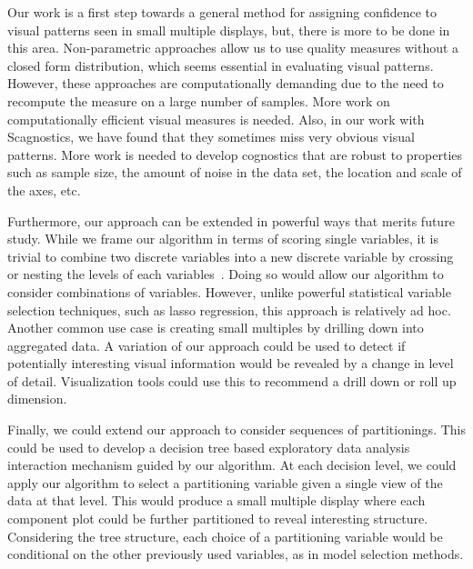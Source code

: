 Our work is a first step towards a general method for assigning confidence to visual patterns seen in small multiple displays, but, there is more to be done in this area. Non-parametric approaches allow us to use quality measures without a closed form distribution, which seems essential in evaluating visual patterns. However, these approaches are computationally demanding due to the need to recompute the measure on a large number of samples. More work on computationally efficient visual measures is needed. Also, in our work with Scagnostics, we have found that they sometimes miss very obvious visual patterns. More work is needed to develop cognostics that are robust to properties such as sample size, the amount of noise in the data set, the location and scale of the axes, etc. 

Furthermore, our approach can be extended in powerful ways that merits future study. While we frame our algorithm in terms of scoring single variables, it is trivial to combine two discrete variables into a new discrete variable by crossing or nesting the levels of each variables~\cite{Wilkinson2005GG,Stolte2002}. Doing so would allow our algorithm to consider combinations of variables. However, unlike powerful statistical variable selection techniques, such as lasso regression, this approach is relatively ad hoc.
Another common use case is creating small multiples by drilling down into aggregated data. A variation of our approach could be used to detect if potentially interesting visual information would be revealed by a change in level of detail. Visualization tools could use this to recommend a drill down or roll up dimension.

Finally, we could extend our approach to consider sequences of partitionings. This could be used to develop a decision tree based exploratory data analysis interaction mechanism guided by our algorithm. At each decision level, we could apply our algorithm to select a partitioning variable given a single view of the data at that level. This would produce a small multiple display where each component plot could be further partitioned to reveal interesting structure. Considering the tree structure, each choice of a partitioning variable would be conditional on the other previously used variables, as in model selection methods. 

